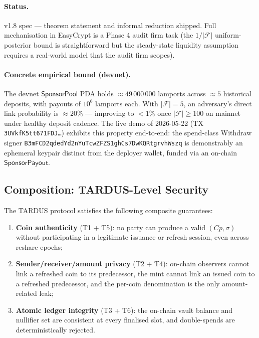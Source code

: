 \paragraph{Status.} v1.8 spec — theorem statement and informal
reduction shipped. Full mechanisation in EasyCrypt is a Phase 4
audit firm task (the $1/|\mathcal{F}|$ uniform-posterior bound
is straightforward but the steady-state liquidity assumption
requires a real-world model that the audit firm scopes).

\paragraph{Concrete empirical bound (devnet).} The devnet
$\mathsf{SponsorPool}$ PDA holds $\approx 49\,000\,000$ lamports
across $\approx 5$ historical deposits, with payouts of
$10^6$ lamports each. With $|\mathcal{F}| = 5$, an adversary's
direct link probability is $\approx 20\%$ — improving to $< 1\%$
once $|\mathcal{F}| \geq 100$ on mainnet under healthy deposit
cadence. The live demo of 2026-05-22 (TX
\texttt{3UVkfK5tt671FDJ\ldots}) exhibits this property
end-to-end: the spend-class Withdraw signer
\texttt{B3mFCD2qdedYd2nYuTcwZFZS1ghCs7DwKQRtgrvhWszq} is
demonstrably an ephemeral keypair distinct from the deployer
wallet, funded via an on-chain $\mathsf{SponsorPayout}$.

\subsection{Composition: TARDUS-Level Security}
\label{sec:composition}

\begin{corollary}
\label{cor:end-to-end}
The TARDUS protocol satisfies the following composite guarantees:
\begin{enumerate}[leftmargin=2em,itemsep=0pt]
  \item \textbf{Coin authenticity} (T1 + T5): no party can produce a valid
        $(Cp, \sigma)$ without participating in a legitimate issuance or
        refresh session, even across reshare epochs;
  \item \textbf{Sender/receiver/amount privacy} (T2 + T4): on-chain
        observers cannot link a refreshed coin to its predecessor, the
        mint cannot link an issued coin to a refreshed predecessor, and
        the per-coin denomination is the only amount-related leak;
  \item \textbf{Atomic ledger integrity} (T3 + T6): the on-chain vault
        balance and nullifier set are consistent at every finalised
        slot, and double-spends are deterministically rejected.
\end{enumerate}
\end{corollary}

